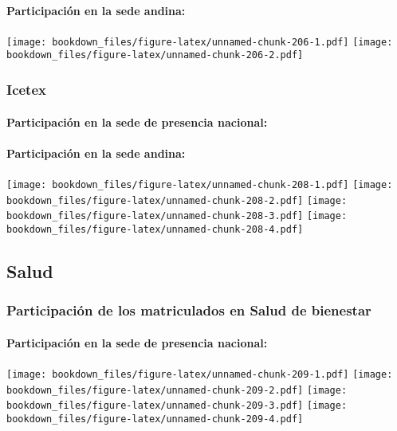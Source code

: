\documentclass[]{article}
\let\oldparagraph\paragraph
\renewcommand{\paragraph}[1]{\oldparagraph{#1}\mbox{}}
\theoremstyle{definition}
\theoremstyle{definition}
\theoremstyle{definition}
\theoremstyle{remark}
\begin{document}
\paragraph{Participación en la sede
andina:}\label{participacion-en-la-sede-andina-15}

\texttt{[image: bookdown\_files/figure-latex/unnamed-chunk-206-1.pdf]}
\texttt{[image: bookdown\_files/figure-latex/unnamed-chunk-206-2.pdf]}

\subsubsection{Icetex}\label{icetex}

\paragraph{Participación en la sede de presencia
nacional:}\label{participacion-en-la-sede-de-presencia-nacional-16}

\paragraph{Participación en la sede
andina:}\label{participacion-en-la-sede-andina-16}

\texttt{[image: bookdown\_files/figure-latex/unnamed-chunk-208-1.pdf]}
\texttt{[image: bookdown\_files/figure-latex/unnamed-chunk-208-2.pdf]}
\texttt{[image: bookdown\_files/figure-latex/unnamed-chunk-208-3.pdf]}
\texttt{[image: bookdown\_files/figure-latex/unnamed-chunk-208-4.pdf]}

\subsection{Salud}\label{salud-1}

\subsubsection{Participación de los matriculados en Salud de
bienestar}\label{participacion-de-los-matriculados-en-salud-de-bienestar-1}

\paragraph{Participación en la sede de presencia
nacional:}\label{participacion-en-la-sede-de-presencia-nacional-17}

\texttt{[image: bookdown\_files/figure-latex/unnamed-chunk-209-1.pdf]}
\texttt{[image: bookdown\_files/figure-latex/unnamed-chunk-209-2.pdf]}
\texttt{[image: bookdown\_files/figure-latex/unnamed-chunk-209-3.pdf]}
\texttt{[image: bookdown\_files/figure-latex/unnamed-chunk-209-4.pdf]}
\end{document}
